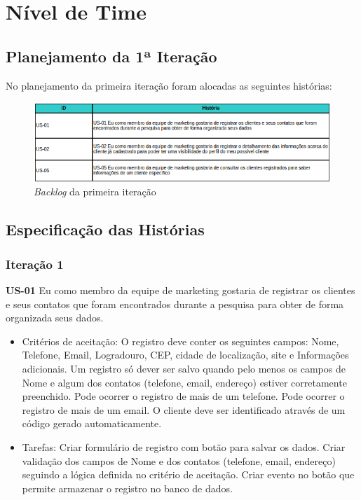 \chapter[Nível de Time]{Nível de Time}

\section{Planejamento da 1ª Iteração}

No planejamento da primeira iteração foram alocadas as seguintes histórias:

\begin{figure}[!htb]
\centering
\includegraphics[scale=0.8]{figuras/backlog_iteracao.png}
\caption{\textit{Backlog} da primeira iteração}
\label{fig:backlog}
\end{figure}

\section{Especificação das Histórias}

\subsection{Iteração 1}

\textbf{US-01} Eu como membro da equipe de marketing gostaria de registrar os clientes e seus contatos que foram encontrados durante a pesquisa para obter de forma organizada seus dados.

\begin{itemize}
 \item Critérios de aceitação:
\subitem O registro deve conter os seguintes campos: Nome, Telefone, Email, Logradouro, CEP, cidade de localização, site e Informações adicionais.
\subitem Um registro só dever ser salvo quando pelo menos os campos de Nome e algum dos contatos (telefone, email, endereço) estiver corretamente preenchido.
\subitem Pode ocorrer o registro de mais de um telefone.
\subitem Pode ocorrer o registro de mais de um email.
\subitem O cliente deve ser identificado através de um código gerado automaticamente.

\item Tarefas:
\subitem Criar formulário de registro com botão para salvar os dados.
\subitem Criar validação dos campos de Nome e dos contatos (telefone, email, endereço) seguindo a lógica definida no critério de aceitação.
\subitem Criar evento no botão que permite armazenar o registro no banco de dados.
\end{itemize}

